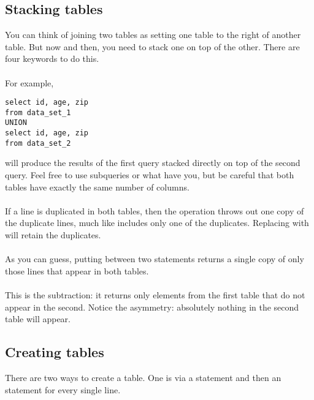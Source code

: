 \subsection{Stacking tables}
You can think of joining two tables as setting one table to the right of
another table. But now and then, you need to stack one on top of
the other. There are four keywords to do this.

\paragraph{} For example, 
\begin{lstlisting}
select id, age, zip
from data_set_1
UNION
select id, age, zip
from data_set_2
\end{lstlisting}
will produce the results of the first query stacked directly on top of
the second query. Feel free to use subqueries or what have you, but be
careful that both tables have exactly the same number of columns.

\paragraph{} If a line is duplicated in both tables,
then the  operation throws out
one copy of the duplicate lines, much like 
includes only one of the duplicates. Replacing  with  will retain the duplicates.

\paragraph{} As you can guess,
putting  between two  statements
returns a single copy of only those lines that appear in both tables.

\paragraph{} This is the subtraction: it returns only
elements from the first table that do not appear in the second. Notice
the asymmetry: absolutely nothing in the second table will appear. 

\subsection{Creating tables} There are two ways to create a table. One
is via  a  statement and then an  statement
for every single line. 

